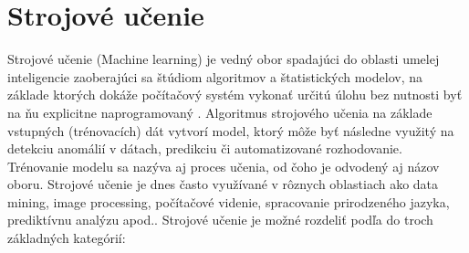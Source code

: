 \documentclass[slovak, master]{diploma}
\begin{document}
\chapter{Strojové učenie}
\label{sec:MachineLearningOverview}
Strojové učenie (Machine learning) je vedný obor spadajúci do oblasti umelej inteligencie zaoberajúci sa štúdiom algoritmov a štatistických modelov, na základe ktorých dokáže počítačový systém vykonať určitú úlohu bez nutnosti byť na ňu explicitne naprogramovaný \cite{mahesh2020machine}. Algoritmus strojového učenia na základe vstupných (trénovacích) dát vytvorí model, ktorý môže byť následne využitý na detekciu anomálií v dátach, predikciu či automatizované rozhodovanie. Trénovanie modelu sa nazýva aj proces učenia, od čoho je odvodený aj názov oboru. Strojové učenie je dnes často využívané v rôznych oblastiach ako data mining, image processing, počítačové videnie, spracovanie prirodzeného jazyka, prediktívnu analýzu apod.\cite{zhou2021machine}.
Strojové učenie je možné rozdeliť podľa do troch základných kategórií: %
\end{document}
